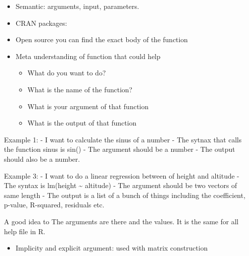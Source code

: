 \documentclass[
  letterpaper,
  DIV=11,
  numbers=noendperiod]{scrreprt}
\providecommand{\tightlist}{%
  \setlength{\itemsep}{0pt}\setlength{\parskip}{0pt}}
\begin{document}

\begin{itemize}
\item
  Semantic: arguments, input, parameters.
\item
  CRAN packages:
\item
  Open source you can find the exact body of the function
\item
  Meta understanding of function that could help

  \begin{itemize}
  \tightlist
  \item
    What do you want to do?
  \item
    What is the name of the function?
  \item
    What is your argument of that function
  \item
    What is the output of that function
  \end{itemize}
\end{itemize}

Example 1: - I want to calculate the sinus of a number - The sytnax that
calls the function sinus is sin() - The argument should be a number -
The output should also be a number.

Example 3: - I want to do a linear regression between of height and
altitude - The syntax is lm(height \textasciitilde{} altitude) - The
argument should be two vectors of same length - The output is a list of
a bunch of things including the coefficient, p-value, R-squared,
residuals etc.

A good idea to The arguments are there and the values. It is the same
for all help file in R.

\begin{itemize}
\tightlist
\item
  Implicity and explicit argument: used with matrix construction
\end{itemize}
\end{document}
